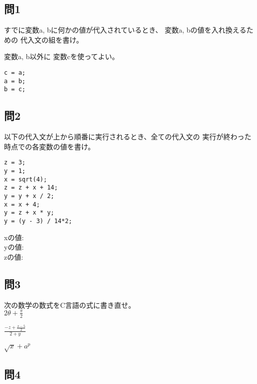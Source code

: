 \documentclass[a4j]{jarticle}
\begin{document}
\begin{multicols*}{2}
\subsection*{問1}

すでに変数{\ttfamily a, b}に何かの値が代入されているとき、
変数{\ttfamily a, b}の値を入れ換えるための
代入文の組を書け。

変数{\ttfamily a, b}以外に
変数{\ttfamily c}を使ってよい。

\ifnum {}
\vspace*{3cm}
\else
\begin{verbatim}
c = a;
a = b;
b = c;
\end{verbatim}\vspace*{1cm}
\fi



\subsection*{問2}

以下の代入文が上から順番に実行されるとき、全ての代入文の
実行が終わった時点での各変数の値を書け。

\begin{verbatim}
z = 3;
y = 1;
x = sqrt(4);
z = z + x + 14;
y = y + x / 2;
x = x + 4;
y = z + x * y;
y = (y - 3) / 14*2;
\end{verbatim}


{\ttfamily x}の値:\\

{\ttfamily y}の値:\\

{\ttfamily z}の値:\\




\subsection*{問3}
次の数学の数式をC言語の式に書き直せ。\\

$2\theta+\frac{\pi}{2}$

$\frac{-z+\frac{x-5}{2}}{2+y}$

$\sqrt{x}+a^p$


\subsection*{問4}




\end{multicols*}
\end{document}
